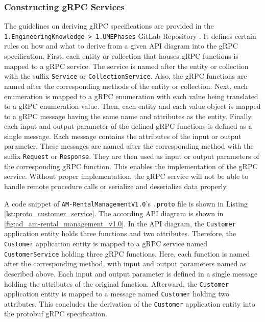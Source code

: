 \subsubsection*{Constructing gRPC Services}
The guidelines on deriving gRPC specifications are provided in the \hfill \linebreak \texttt{1.EngineeringKnowledge > 1.UMEPhases} GitLab Repository \cite{CM-G-RPC}.
It defines certain rules on how and what to derive from a given API diagram into the gRPC specification.
First, each entity or collection that houses gRPC functions is mapped to a gRPC service.
The service is named after the entity or collection with the suffix \texttt{Service} or \texttt{CollectionService}.
Also, the gRPC functions are named after the corresponding methods of the entity or collection.
Next, each enumeration is mapped to a gRPC enumeration with each value being translated to a gRPC enumeration value.
Then, each entity and each value object is mapped to a gRPC message having the same name and attributes as the entity.
Finally, each input and output parameter of the defined gRPC functions is defined as a single message.
Each message contains the attributes of the input or output parameter.
These messages are named after the corresponding method with the suffix \texttt{Request} or \texttt{Response}.
They are then used as input or output parameters of the corresponding gRPC function.
This enables the implementation of the gRPC service.
Without proper implementation, the gRPC service will not be able to handle remote procedure calls or serialize and deserialize data properly.

A code snippet of \texttt{AM-RentalManagementV1.0}'s \texttt{.proto} file is shown in Listing \autoref{lst:proto_customer_service}.
The according API diagram is shown in \autoref{fig:ad_am-rental_management_v1.0}.
In the API diagram, the \texttt{Customer} application entity holds three functions and two attributes.
Therefore, the \texttt{Customer} application entity is mapped to a gRPC service named \texttt{CustomerService} holding three gRPC functions.
Here, each function is named after the corresponding method, with input and output parameters named as described above.
Each input and output parameter is defined in a single message holding the attributes of the original function.
Afterward, the \texttt{Customer} application entity is mapped to a message named \texttt{Customer} holding two attributes.
This concludes the derivation of the \texttt{Customer} application entity into the protobuf gRPC specification.


